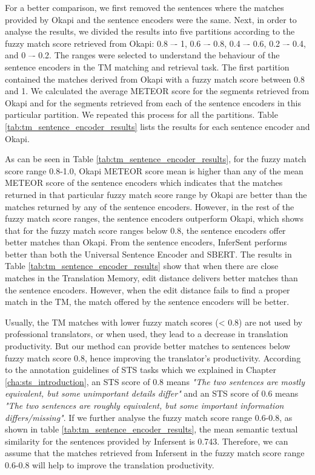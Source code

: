 For a better comparison, we first removed the sentences where the matches provided by Okapi and the sentence encoders were the same. Next, in order to analyse the results, we divided the results into five partitions according to the fuzzy match score retrieved from Okapi: 0.8 –- 1, 0.6 –- 0.8, 0.4 –- 0.6, 0.2 –- 0.4, and 0 –- 0.2. The ranges were selected to understand the behaviour of the sentence encoders in the TM matching and retrieval task. The first partition contained the matches derived from Okapi with a fuzzy match score between 0.8 and 1. We calculated the average METEOR score for the segments retrieved from Okapi and for the segments retrieved from each of the sentence encoders in this particular partition. We repeated this process for all the partitions. Table \ref{tab:tm_sentence_encoder_results} lists the results for each sentence encoder and Okapi. 

As can be seen in Table \ref{tab:tm_sentence_encoder_results}, for the fuzzy match score range 0.8-1.0, Okapi METEOR score mean is higher than any of the mean METEOR score of the sentence encoders which indicates that the matches returned in that particular fuzzy match score range by Okapi are better than the matches returned by any of the sentence encoders. However, in the rest of the fuzzy match score ranges, the sentence encoders outperform Okapi, which shows that for the fuzzy match score ranges below 0.8, the sentence encoders offer better matches than Okapi. From the sentence encoders, InferSent performs better than both the Universal Sentence Encoder and SBERT. The results in Table \ref{tab:tm_sentence_encoder_results} show that when there are close matches in the Translation Memory, edit distance delivers better matches than the sentence encoders. However, when the edit distance fails to find a proper match in the TM, the match offered by the sentence encoders will be better. 

Usually, the TM matches with lower fuzzy match scores (< 0.8) are not used by professional translators, or when used, they lead to a decrease in translation productivity. But our method can provide better matches to sentences below fuzzy match score 0.8, hence improving the translator's productivity. According to the annotation guidelines of STS tasks which we explained in Chapter \ref{cha:sts_introduction}, an STS score of 0.8 means \textit{"The two sentences are mostly equivalent, but some unimportant details differ"} and an STS score of 0.6 means \textit{"The two sentences are roughly equivalent, but some important information differs/missing"}. If we further analyse the fuzzy match score range 0.6-0.8, as shown in table \ref{tab:tm_sentence_encoder_results}, the mean semantic textual similarity for the sentences provided by Infersent is 0.743. Therefore, we can assume that the matches retrieved from Infersent in the fuzzy match score range 0.6-0.8 will help to improve the translation productivity.


